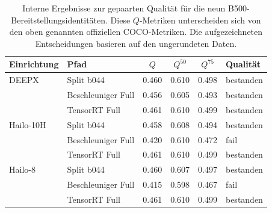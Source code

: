 \begin{table}[htbp]
\centering\small\TableSetup
\caption{Interne Ergebnisse zur gepaarten Qualität für die neun B500-Bereitstellungsidentitäten. Diese $Q$-Metriken unterscheiden sich von den oben genannten offiziellen COCO-Metriken. Die aufgezeichneten Entscheidungen basieren auf den ungerundeten Daten.}
\label{tab:evaluation:yolov7_standard_quality}
\begin{tabularx}{\linewidth}{@{}L{1.55cm}Y S[table-format=1.3] S[table-format=1.3] S[table-format=1.3]l@{}}
\toprule
\textbf{Einrichtung} & \textbf{Pfad} & {$Q$} & {$Q^{50}$} & {$Q^{75}$} & \textbf{Qualität} \\
\midrule
DEEPX & Split b044 & 0.460 & 0.610 & 0.498 & bestanden \\
 & Beschleuniger Full & 0.456 & 0.605 & 0.493 & bestanden \\
 & TensorRT Full & 0.461 & 0.610 & 0.499 & bestanden \\
\addlinespace[.3em]
Hailo-10H & Split b044 & 0.458 & 0.608 & 0.494 & bestanden \\
 & Beschleuniger Full & 0.420 & 0.610 & 0.472 & fail \\
 & TensorRT Full & 0.461 & 0.610 & 0.499 & bestanden \\
\addlinespace[.3em]
Hailo-8 & Split b044 & 0.460 & 0.607 & 0.497 & bestanden \\
 & Beschleuniger Full & 0.415 & 0.598 & 0.467 & fail \\
 & TensorRT Full & 0.461 & 0.610 & 0.499 & bestanden \\
\bottomrule
\end{tabularx}
\end{table}
